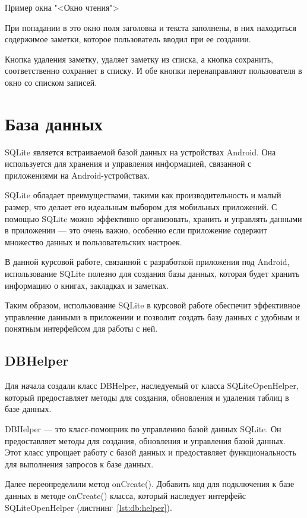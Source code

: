 \begin{image}
	\caption{Пример окна "<Окно чтения">}
	\label{fig:w:notes:change}
\end{image}

При попадании в это окно поля заголовка и текста заполнены, в них
находиться содержимое заметки, которое пользователь вводил при ее
создании.\par
Кнопка удаления заметку, удаляет заметку из списка, а кнопка
сохранить, соответственно сохраняет в списку. И обе кнопки перенаправляют
пользователя в окно со списком записей.

\section{База данных}
SQLite является встраиваемой базой данных на устройствах Android.
Она используется для хранения и управления информацией,
связанной с приложениями на Android-устройствах. \par
SQLite обладает преимуществами, такими как производительность и малый размер,
что делает его идеальным выбором для мобильных приложений.
С помощью SQLite можно эффективно организовать, хранить и управлять данными
в приложении --- это очень важно, особенно если приложение
содержит множество данных и пользовательских настроек.\par
В данной курсовой работе, связанной с разработкой приложения под Android,
использование SQLite полезно для создания базы данных,
которая будет хранить информацию о книгах, закладках и заметках.\par

Таким образом, использование SQLite в курсовой работе обеспечит
эффективное управление данными в приложении и позволит создать
базу данных с удобным и понятным интерфейсом для работы с ней.

\subsection{DBHelper}
Для начала создали класс DBHelper, наследуемый от класса SQLiteOpenHelper,
который предоставляет методы для создания, обновления и удаления
таблиц в базе данных.\par
DBHelper --- это класс-помощник по управлению базой данных SQLite.
Он предоставляет методы для создания, обновления и управления базой данных.
Этот класс упрощает работу с базой данных и предоставляет функциональность
для выполнения запросов к базе данных.\par
Далее переопределили метод onCreate().
Добавить код для подключения к базе данных в методе onCreate() класса,
который наследует интерфейс SQLiteOpenHelper (листнинг~\ref{lst:db:helper}).

